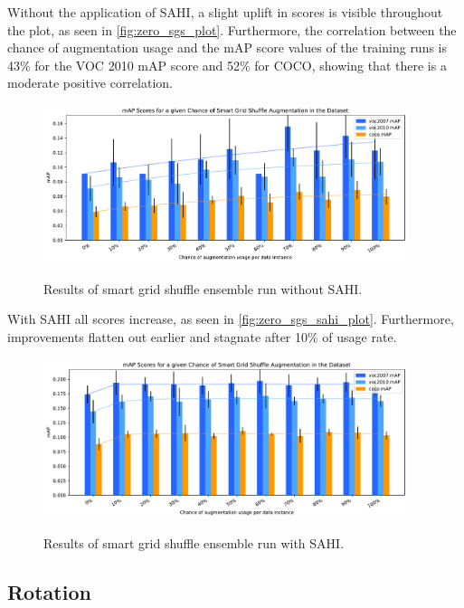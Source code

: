 \documentclass[10pt]{book}
\newcommand{\figureref}[1]{\autoref{#1}}
\begin{document}
Without the application of \ac{SAHI}, a slight uplift in scores is visible throughout the plot, as seen in \figureref{fig:zero_sgs_plot}. Furthermore, the correlation between the chance of augmentation usage and the \ac{mAP} score values of the training runs is 43\% for the VOC 2010 \ac{mAP} score and 52\% for \ac{COCO}, showing that there is a moderate positive correlation.

\begin{figure}
  \caption{Results of smart grid shuffle ensemble run without \ac{SAHI}.}
  \includegraphics[width=0.95\textwidth]{image/zero-based-sgs-ensemble-2-thesis-2}
  \label{fig:zero_sgs_plot}
\end{figure}

With \ac{SAHI} all scores increase, as seen in \figureref{fig:zero_sgs_sahi_plot}. Furthermore, improvements flatten out earlier and stagnate after 10\% of usage rate.

\begin{figure}
  \caption{Results of smart grid shuffle ensemble run with \ac{SAHI}.}
  \includegraphics[width=0.95\textwidth]{image/zero-based-sgs-sahi-ensemble-2-thesis-2}
  \label{fig:zero_sgs_sahi_plot}
\end{figure}

\subsection{Rotation}
\end{document}
